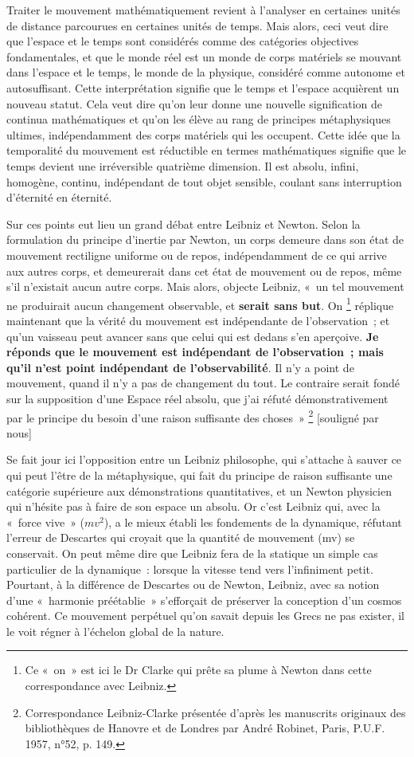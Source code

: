 \documentclass[a4paper,12pt]{article}
\begin{document}
Traiter le mouvement mathématiquement revient à l'analyser en certaines unités de distance parcourues en certaines unités de temps. Mais alors, ceci veut dire que l'espace et le temps sont considérés comme des catégories objectives fondamentales, et que le monde réel est un monde de corps matériels se mouvant dans l'espace et le temps, le monde de la physique, considéré comme autonome et autosuffisant. Cette interprétation signifie que le temps et l'espace acquièrent un nouveau statut. Cela veut dire qu'on leur donne une nouvelle signification de continua mathématiques et qu'on les élève au rang de principes métaphysiques ultimes, indépendamment des corps matériels qui les occupent. Cette idée que la temporalité du mouvement est réductible en termes mathématiques signifie que le temps devient une irréversible quatrième dimension. Il est absolu, infini, homogène, continu, indépendant de tout objet sensible, coulant sans interruption d'éternité en éternité.

Sur ces points eut lieu un grand débat entre Leibniz et Newton. Selon la formulation du principe d’inertie par Newton, un corps demeure dans son état de mouvement rectiligne uniforme ou de repos, indépendamment de ce qui arrive aux autres corps, et demeurerait dans cet état de mouvement ou de repos, même s’il n’existait aucun autre corps. Mais alors, objecte Leibniz, « un tel mouvement ne produirait aucun changement observable, et  \textbf{serait sans but}. On \footnote{Ce « on » est ici le Dr Clarke qui prête sa plume à Newton dans cette correspondance avec Leibniz.} réplique maintenant que la vérité du mouvement est indépendante de l’observation ; et qu’un vaisseau peut avancer sans que celui qui est dedans s’en aperçoive.  \textbf{Je réponds que le mouvement est indépendant de l’observation ; mais qu’il n’est point indépendant de l’observabilité}. Il n’y a point de mouvement, quand il n’y a pas de changement du tout. Le contraire serait fondé sur la supposition d’une Espace réel absolu, que j’ai réfuté démonstrativement par le principe du besoin d’une raison suffisante des choses » \footnote{Correspondance Leibniz-Clarke présentée d’après les manuscrits originaux des bibliothèques de Hanovre et de Londres par André Robinet, Paris, P.U.F. 1957, n°52, p. 149.} [souligné par nous]

Se fait jour ici l'opposition entre un Leibniz philosophe, qui s'attache à sauver ce qui peut l'être de la métaphysique, qui fait du principe de raison suffisante une catégorie supérieure aux démonstrations quantitatives, et un Newton physicien qui n'hésite pas à faire de son espace un absolu. Or c’est Leibniz qui, avec la « force vive » ($mv^2$), a le mieux établi les fondements de la dynamique, réfutant l'erreur de Descartes qui croyait que la quantité de mouvement (mv) se conservait. On peut même dire que Leibniz fera de la statique un simple cas particulier de la dynamique : lorsque la vitesse tend vers l'infiniment petit. Pourtant, à la différence de Descartes ou de Newton, Leibniz, avec sa notion d’une « harmonie préétablie » s'efforçait de préserver la conception d'un cosmos cohérent. Ce mouvement perpétuel qu'on savait depuis les Grecs ne pas exister, il le voit régner à l'échelon global de la nature. 
\end{document}
